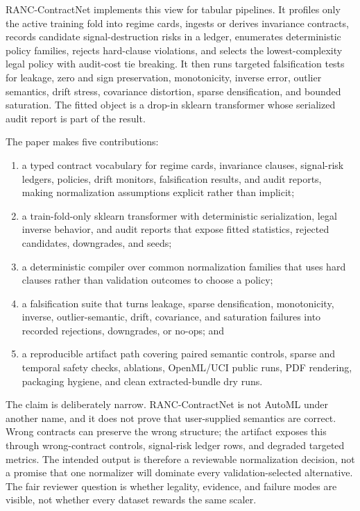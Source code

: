 \documentclass{article}
\begin{document}
RANC-ContractNet implements this view for tabular pipelines. It profiles only
the active training fold into regime cards, ingests or derives invariance
contracts, records candidate signal-destruction risks in a ledger, enumerates
deterministic policy families, rejects hard-clause violations, and selects the
lowest-complexity legal policy with audit-cost tie breaking. It then runs
targeted falsification tests for leakage, zero and sign preservation,
monotonicity, inverse error, outlier semantics, drift stress, covariance
distortion, sparse densification, and bounded saturation. The fitted object is a
drop-in sklearn transformer whose serialized audit report is part of the result.

The paper makes five contributions:
\begin{enumerate}
\setlength{\itemsep}{0pt}
\setlength{\parsep}{0pt}
  \item a typed contract vocabulary for regime cards, invariance clauses,
  signal-risk ledgers, policies, drift monitors, falsification results, and
  audit reports, making normalization assumptions explicit rather than implicit;
  \item a train-fold-only sklearn transformer with deterministic serialization,
  legal inverse behavior, and audit reports that expose fitted statistics,
  rejected candidates, downgrades, and seeds;
  \item a deterministic compiler over common normalization families that uses
  hard clauses rather than validation outcomes to choose a policy;
  \item a falsification suite that turns leakage, sparse densification,
  monotonicity, inverse, outlier-semantic, drift, covariance, and saturation
  failures into recorded rejections, downgrades, or no-ops; and
  \item a reproducible artifact path covering paired semantic controls, sparse
  and temporal safety checks, ablations, OpenML/UCI public runs, PDF rendering,
  packaging hygiene, and clean extracted-bundle dry runs.
\end{enumerate}
The claim is deliberately narrow. RANC-ContractNet is not AutoML under another
name, and it does not prove that user-supplied semantics are correct. Wrong
contracts can preserve the wrong structure; the artifact exposes this through
wrong-contract controls, signal-risk ledger rows, and degraded targeted metrics.
The intended output is therefore a reviewable normalization decision, not a
promise that one normalizer will dominate every validation-selected alternative.
The fair reviewer question is whether legality, evidence, and failure modes are
visible, not whether every dataset rewards the same scaler.
\end{document}

